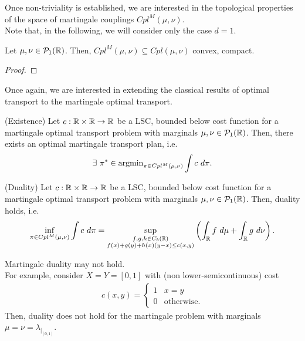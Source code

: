 \documentclass[../main.tex]{subfiles}
\begin{document}
Once non-triviality is established, we are interested in the topological properties of the space of martingale couplings $Cpl^M(\mu, \nu)$.\\
\noindent
Note that, in the following, we will consider only the case $d=1$.
\begin{theorem}
    Let $\mu, \nu\in\mathcal{P}_1(\mathbb{R})$. Then, $Cpl^M(\mu, \nu)\subseteq Cpl(\mu, \nu)$ convex, compact.
\end{theorem}
\begin{proof}
    
\end{proof}

Once again, we are interested in extending the classical results of optimal transport to the martingale optimal transport.

\begin{theorem}
    (Existence) Let $c: \mathbb{R}\times \mathbb{R}\to \mathbb{R}$ be a LSC, bounded below cost function for a martingale optimal transport problem with marginals $\mu, \nu\in\mathcal{P}_1(\mathbb{R})$. Then, there exists an optimal martingale transport plan, i.e. $$\exists \ \pi^*\in \argmin_{\pi \in Cpl^M(\mu, \nu)} \int c \ d\pi.$$
\end{theorem}

\begin{theorem}
    (Duality)  Let $c: \mathbb{R}\times \mathbb{R}\to \mathbb{R}$ be a LSC, bounded below cost function for a martingale optimal transport problem with marginals $\mu, \nu\in\mathcal{P}_1(\mathbb{R})$. Then, duality holds, i.e.
    $$
    \inf_{\pi\in Cpl^M(\mu, \nu)} \int c \ d\pi = \sup_{\substack{f, g, h\in C_b(\mathbb{R}) \\ f(x)+g(y)+h(x)(y-x)\leq c(x, y)}} \left(\int_{\mathbb{R}} f \ d\mu + \int_{\mathbb{R}} g \ d\nu\right).
    $$
\end{theorem}

\begin{remark}
    Martingale duality may not hold. \\
    For example, consider $X=Y=[0,1]$ with (non lower-semicontinuous) cost 
    \begin{align*}
        c(x, y) = 
        \begin{cases}
            1 & x=y \\
            0 & \text{otherwise}.
        \end{cases}
    \end{align*}
    Then, duality does not hold for the martingale problem with marginals $\mu=\nu=\lambda_{|_{[0,1]}}$.
\end{remark}
\end{document}
